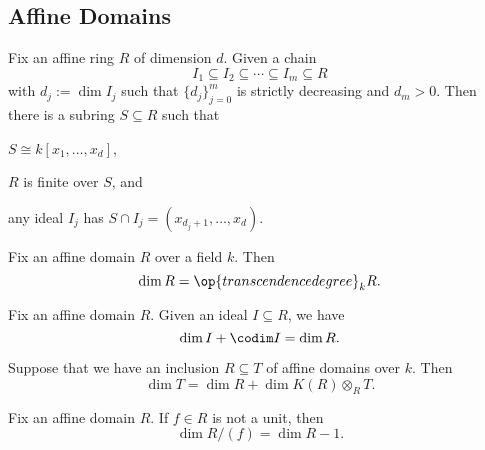 \documentclass{article}
\begin{document}
\subsection{Affine Domains}
\begin{theorem*}[Theorem 13.3] \label{thm:noethernormal}
	Fix an affine ring $R$ of dimension $d$. Given a chain
	\[I_1\subseteq I_2\subseteq\cdots\subseteq I_m\subseteq R\]
	with $d_j:=\dim I_j$ such that $\{d_j\}_{j=0}^m$ is strictly decreasing and $d_m>0$. Then there is a subring $S\subseteq R$ such that
	\begin{listalph}
		\item $S\cong k[x_1,\ldots,x_d]$,
		\item $R$ is finite over $S$, and
		\item any ideal $I_j$ has $S\cap I_j=(x_{d_j+1},\ldots,x_d)$.
	\end{listalph}
\end{theorem*}
\begin{theorem*}[Theorem A]
	Fix an affine domain $R$ over a field $k$. Then
	\[\dim R=\op{transcendence degree}_kR.\]
\end{theorem*}
\begin{corollary*}[Corollary 13.4]
	Fix an affine domain $R$. Given an ideal $I\subseteq R$, we have
	\[\dim I+\codim I=\dim R.\]
\end{corollary*}
\begin{corollary*}[Corollary 13.5]
	Suppose that we have an inclusion $R\subseteq T$ of affine domains over $k$. Then
	\[\dim T=\dim R+\dim K(R)\otimes_RT.\]
\end{corollary*}
\begin{cor*}[Corollary 13.11]
	Fix an affine domain $R$. If $f\in R$ is not a unit, then
	\[\dim R/(f)=\dim R-1.\]
\end{cor*}
\end{document}
